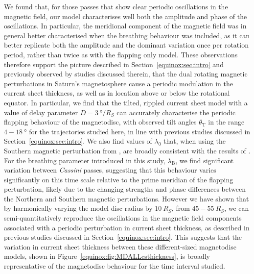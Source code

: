We found that, for those passes that show clear periodic oscillations in the magnetic field, our model characterises well both the amplitude and phase of the oscillations. In particular, the meridional component of the magnetic field was in general better characterised when the breathing behaviour was included, as it can better replicate both the amplitude and the dominant variation once per rotation period, rather than twice as with the flapping only model. These observations therefore support the picture described in Section~\ref{equinox:sec:intro} and previously observed by studies discussed therein, that the dual rotating magnetic perturbations in Saturn's magnetosphere cause a periodic modulation in the current sheet thickness, as well as in location above or below the rotational equator. In particular, we find that the \citet{arridge2011} tilted, rippled current sheet model with a value of delay parameter $D = \SI{3}{\degree/R_S}$ can accurately characterise the periodic flapping behaviour of the magnetodisc, with observed tilt angles $\theta_\mathrm{T}$ in the range $4-\SI{18}{\degree}$ for the trajectories studied here, in line with previous studies discussed in Section~\ref{equinox:sec:intro}. We also find values of $\lambda_0$ that, when using the Southern magnetic perturbation from \citet{andrews2012}, are broadly consistent with the results of \citet{arridge2011}. For the breathing parameter introduced in this study, $\lambda_\mathrm{B}$, we find significant variation between \textit{Cassini }passes, suggesting that this behaviour varies significantly on this time scale relative to the prime meridian of the flapping perturbation, likely due to the changing strengths and phase differences between the Northern and Southern magnetic perturbations. However we have shown that by harmonically varying the model disc radius by $\SI{10}{R_S}$, from $45-\SI{55}{R_S}$, we can semi-quantitatively reproduce the oscillations in the magnetic field components associated with a periodic perturbation in current sheet thickness, as described in previous studies discussed in Section~\ref{equinox:sec:intro}. This suggests that the variation in current sheet thickness between these different-sized magnetodisc models, shown in Figure~\ref{equinox:fig:MDALLcsthickness}, is broadly representative of the magnetodisc behaviour for the time interval studied.

